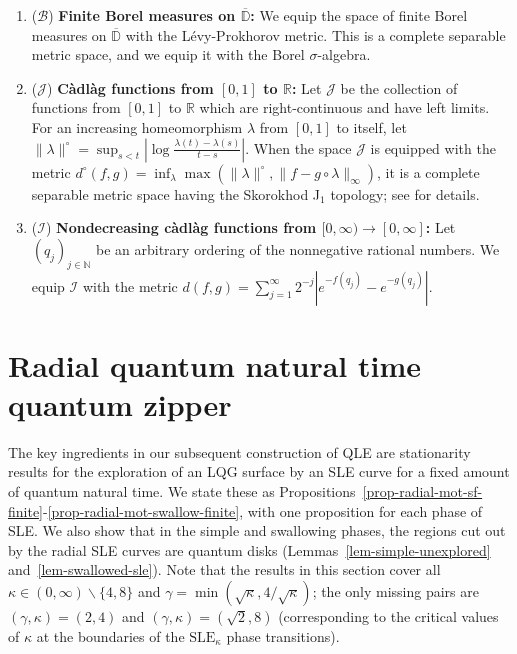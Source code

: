 \documentclass[a4paper]{article}
\numberwithin{equation}{section}
\newcommand{\D}{\mathbb{D}}
\newcommand{\R}{\mathbb{R}}
\newcommand{\N}{\mathbb{N}}
\newcommand{\SLE}{\mathrm{SLE}}
\theoremstyle{remark}
\numberwithin{equation}{section}
\begin{document}
\begin{enumerate}
    \item ($\mathcal{B}$) \textbf{Finite Borel measures on $\overline{\D}$:} We equip the space of finite Borel measures on $\overline{\D}$ with the L\'evy-Prokhorov metric. This is a complete separable metric space, and we equip it with the Borel $\sigma$-algebra.

    \item ($\mathcal{J}$) \textbf{C\`adl\`ag functions from $[0,1]$ to $\R$:} Let $\mathcal J$ be the collection of functions from $[0,1]$ to $\R$ which are right-continuous and have left limits. For an increasing homeomorphism $\lambda$ from $[0,1]$ to itself, let $\|\lambda\|^\circ = \sup_{s < t} | \log \frac{\lambda(t) - \lambda(s)}{t-s}|$. When the space $\mathcal J$ is equipped with the  metric $d^\circ(f,g) = \inf_\lambda \max(\|\lambda\|^\circ, \| f - g\circ \lambda \|_\infty)$, 
    it is a complete separable metric space having the Skorokhod J$_1$ topology; see \cite[Section 12]{billingsley2013convergence} for details.

    \item ($\mathcal I$)  \textbf{Nondecreasing c\`adl\`ag functions from $[0,\infty) \to [0,\infty]$:} Let $(q_j)_{j \in \N}$ be an arbitrary ordering of the nonnegative rational numbers. We equip $\mathcal I$ with the metric $d(f,g) = \sum_{j=1}^\infty 2^{-j}\left| e^{-f(q_j)} - e^{-g(q_j)}\right|$.
\end{enumerate}

\section{Radial quantum natural time quantum zipper}\label{sec-zippers}
The key ingredients in our subsequent construction of QLE are stationarity results for the exploration of an LQG surface by an SLE curve for a fixed amount of quantum natural time. We state these as Propositions~\ref{prop-radial-mot-sf-finite}-\ref{prop-radial-mot-swallow-finite}, with one proposition for each phase of SLE. We also show that in the simple and swallowing phases, the regions cut out by the radial SLE curves are quantum disks (Lemmas~\ref{lem-simple-unexplored} and~\ref{lem-swallowed-sle}). Note that the results in this section cover all $\kappa \in (0,\infty) \backslash \{4, 8\}$ and $\gamma = \min (\sqrt\kappa, 4/\sqrt\kappa)$; the only missing pairs are $(\gamma, \kappa) = (2, 4)$ and $(\gamma, \kappa) = (\sqrt2, 8)$ (corresponding to the critical values of $\kappa$ at the boundaries of the $\SLE_\kappa$ phase transitions). 
\end{document}
